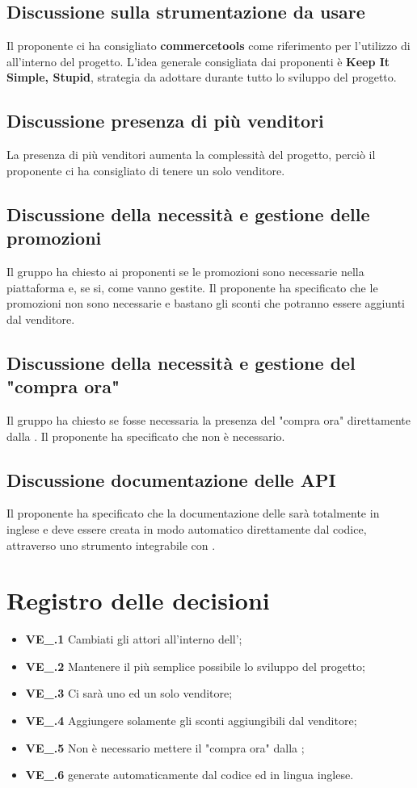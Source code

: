 \subsection{Discussione sulla strumentazione da usare}
Il proponente ci ha consigliato \textbf{commercetools} come riferimento per l'utilizzo di  all'interno del progetto. L'idea generale consigliata dai proponenti è \textbf{Keep It Simple, Stupid}, strategia da adottare durante tutto lo sviluppo del progetto.
\subsection{Discussione presenza di più venditori}
La presenza di più venditori aumenta la complessità del progetto, perciò il proponente ci ha consigliato di tenere un solo venditore.
\subsection{Discussione della necessità e gestione delle promozioni}
Il gruppo ha chiesto ai proponenti se le promozioni sono necessarie nella piattaforma e, se si, come vanno gestite.
Il proponente ha specificato che le promozioni non sono necessarie e bastano gli sconti che potranno essere aggiunti dal venditore.
\subsection{Discussione della necessità e gestione del "compra ora"}
Il gruppo ha chiesto se fosse necessaria la presenza del "compra ora" direttamente dalla . Il proponente ha specificato che non è necessario.
\subsection{Discussione documentazione delle API}
Il proponente ha specificato che la documentazione delle  sarà totalmente in inglese e deve essere creata in modo automatico direttamente dal codice, attraverso uno strumento integrabile con .

\section{Registro delle decisioni}
\begin{itemize}
  \item \textbf{VE\_\Data.1} Cambiati gli attori all'interno dell'\AdR;
  \item \textbf{VE\_\Data.2} Mantenere il più semplice possibile lo sviluppo del progetto;
  \item \textbf{VE\_\Data.3} Ci sarà uno ed un solo venditore;
  \item \textbf{VE\_\Data.4} Aggiungere solamente gli sconti aggiungibili dal venditore;
  \item \textbf{VE\_\Data.5} Non è necessario mettere il "compra ora" dalla ;
  \item \textbf{VE\_\Data.6}  generate automaticamente dal codice ed in lingua inglese.
\end{itemize}